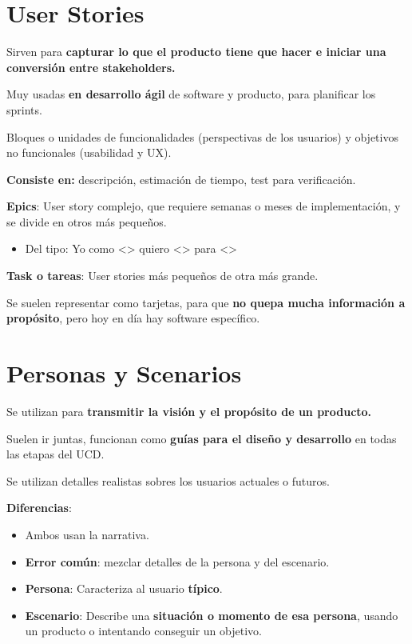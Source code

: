 \documentclass[12pt, twoside, openright]{report} %
\begin{document}
\section{User Stories}

Sirven para \textbf{capturar lo que el producto tiene que hacer e iniciar
una conversión entre stakeholders.}

Muy usadas \textbf{en desarrollo ágil} de software y producto, para
planificar los sprints.

Bloques o unidades de funcionalidades (perspectivas de los usuarios) y
objetivos no funcionales (usabilidad y UX).

\textbf{Consiste en:} descripción, estimación de tiempo, test para
verificación.

\textbf{Epics}: User story complejo, que requiere semanas o meses de
implementación, y se divide en otros más pequeños.

\begin{itemize}

\item
  Del tipo: Yo como \textless\textgreater{} quiero
  \textless\textgreater{} para \textless\textgreater{}
\end{itemize}

\textbf{Task o tareas}: User stories más pequeños de otra más grande.

Se suelen representar como tarjetas, para que \textbf{no quepa mucha
información a propósito}, pero hoy en día hay software específico.

\section{Personas y Scenarios}

Se utilizan para \textbf{transmitir la visión y el propósito de un
producto.}

Suelen ir juntas, funcionan como \textbf{guías para el diseño y
desarrollo} en todas las etapas del UCD.

Se utilizan detalles realistas sobres los usuarios actuales o futuros.

\textbf{Diferencias}:

\begin{itemize}

\item
  Ambos usan la narrativa.
\item
  \textbf{Error común}: mezclar detalles de la persona y del escenario.
\item
  \textbf{Persona}: Caracteriza al usuario \textbf{típico}.
\item
  \textbf{Escenario}: Describe una \textbf{situación o momento de esa
  persona}, usando un producto o intentando conseguir un objetivo.
\end{itemize}
\end{document}
